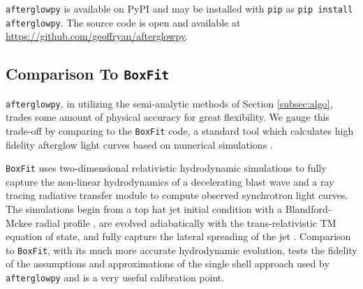 \documentclass[twocolumn]{aastex62}
\newcommand{\afterglowpy}{{\tt afterglowpy}}
\newcommand{\boxfit}{{\tt BoxFit}}
\begin{document}
\afterglowpy{} is available on PyPI and may be installed with {\tt pip} as {\tt pip install afterglowpy}.  The source code is open and available at \url{https://github.com/geoffryan/afterglowpy}.

\subsection{Comparison To \boxfit{}} \label{subsec:boxfitcomp}

\afterglowpy{}, in utilizing the semi-analytic methods of Section \ref{subsec:algo}, trades some amount of physical accuracy for great flexibility.  We gauge this trade-off by comparing to the \boxfit{} code, a standard tool which calculates high fidelity afterglow light curves based on numerical simulations \citep{van-Eerten:2012ab}.  

\boxfit{} uses two-dimensional relativistic hydrodynamic simulations to fully capture the non-linear hydrodynamics of a decelerating blast wave and a ray tracing radiative transfer module to compute observed synchrotron light curves.  The simulations begin from a top hat jet initial condition with a Blandford-Mckee radial profile \citep{Blandford:1976aa}, are evolved adiabatically with the trans-relativistic TM equation of state, and fully capture the lateral spreading of the jet \citep{van-Eerten:2012ab}.  Comparison to \boxfit{}, with its much more accurate hydrodynamic evolution, tests the fidelity of the assumptions and approximations of the single shell approach used by \afterglowpy{} and is a very useful calibration point.  
\end{document}
